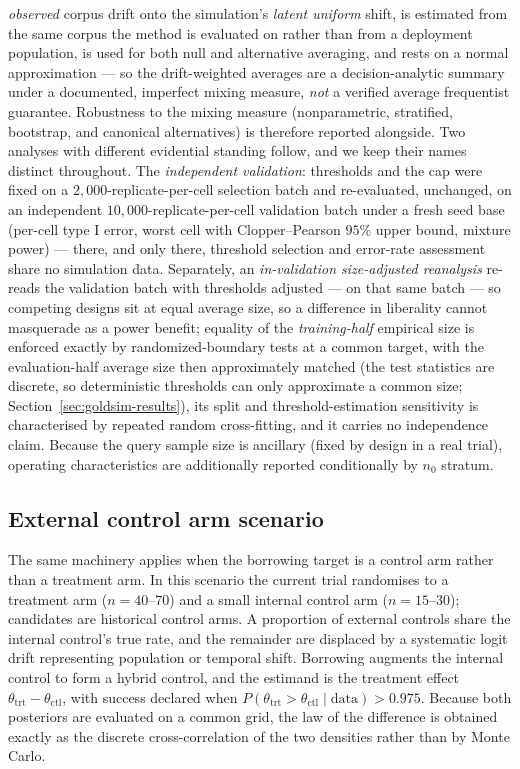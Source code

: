 \documentclass[11pt]{article}
\begin{document}
\emph{observed} corpus drift onto the simulation's \emph{latent uniform}
shift, is estimated from the same corpus the method is evaluated on rather
than from a deployment population, is used for both null and alternative
averaging, and rests on a normal approximation --- so the drift-weighted
averages are a decision-analytic summary under a documented, imperfect
mixing measure, \emph{not} a verified average frequentist guarantee.
Robustness to the mixing measure (nonparametric, stratified, bootstrap,
and canonical alternatives) is therefore reported alongside. Two
analyses with different evidential standing follow, and we keep their
names distinct throughout. The \emph{independent validation}: thresholds
and the cap were fixed on a $2{,}000$-replicate-per-cell selection batch
and re-evaluated, unchanged, on an independent
$10{,}000$-replicate-per-cell validation batch under a fresh seed base
(per-cell type I error, worst cell with Clopper--Pearson $95\%$ upper
bound, mixture power) --- there, and only there, threshold selection and
error-rate assessment share no simulation data. Separately, an
\emph{in-validation size-adjusted reanalysis} re-reads the validation
batch with thresholds adjusted --- on that same batch --- so competing
designs sit at equal average size, so a difference in liberality cannot
masquerade as a power benefit; equality of the \emph{training-half}
empirical size is enforced exactly by randomized-boundary tests at a
common target, with the evaluation-half average size then
approximately matched (the test
statistics are discrete, so deterministic thresholds can only
approximate a common size; Section~\ref{sec:goldsim-results}), its
split and threshold-estimation sensitivity is
characterised by repeated random cross-fitting, and it carries no
independence claim. Because the query sample size is ancillary (fixed by
design in a real trial), operating characteristics are additionally
reported conditionally by $n_0$ stratum.

\subsection{External control arm scenario}
\label{sec:ecmethods}
The same machinery applies when the borrowing target is a control arm rather
than a treatment arm. In this scenario the current trial randomises to a
treatment arm ($n = 40$--$70$) and a small internal control arm ($n = 15$--$30$);
candidates are historical control arms. A proportion of external controls share
the internal control's true rate, and the remainder are displaced by a
systematic logit drift representing population or temporal shift. Borrowing
augments the internal control to form a hybrid control, and the estimand is the
treatment effect $\theta_{\mathrm{trt}} - \theta_{\mathrm{ctl}}$, with success
declared when $P(\theta_{\mathrm{trt}} > \theta_{\mathrm{ctl}} \mid \text{data})
> 0.975$. Because both posteriors are evaluated on a common grid, the law of the
difference is obtained exactly as the discrete cross-correlation of the two
densities rather than by Monte Carlo.
\end{document}
